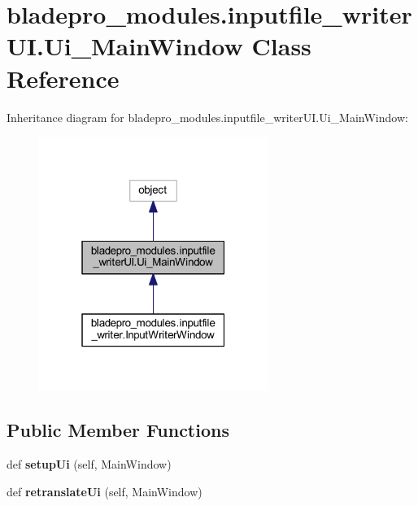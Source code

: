 \hypertarget{a00075}{}\section{bladepro\+\_\+modules.\+inputfile\+\_\+writer\+U\+I.\+Ui\+\_\+\+Main\+Window Class Reference}
\label{a00075}


Inheritance diagram for bladepro\+\_\+modules.\+inputfile\+\_\+writer\+U\+I.\+Ui\+\_\+\+Main\+Window\+:
\nopagebreak
\begin{figure}[H]
\begin{center}
\leavevmode
\includegraphics[width=211pt]{a00074}
\end{center}
\end{figure}
\subsection*{Public Member Functions}
\begin{DoxyCompactItemize}
\item 
\hypertarget{a00075_a77688f6f653ba2711e93269a03753754}{}\label{a00075_a77688f6f653ba2711e93269a03753754} 
def {\bfseries setup\+Ui} (self, Main\+Window)
\item 
\hypertarget{a00075_a640f34d5228b66fcf4118eaa17edf8d6}{}\label{a00075_a640f34d5228b66fcf4118eaa17edf8d6} 
def {\bfseries retranslate\+Ui} (self, Main\+Window)
\end{DoxyCompactItemize}
